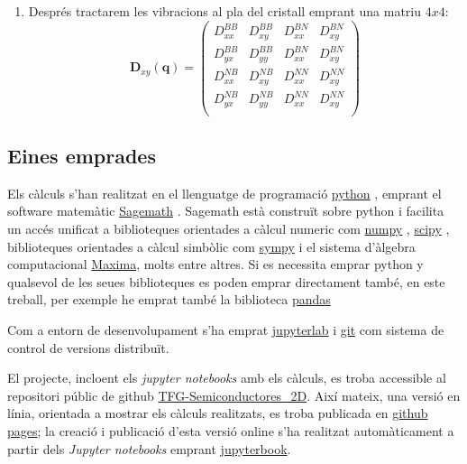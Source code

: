 \documentclass[12pt]{article} %
\let\vec\mathbf %
\begin{document}
{\begin{enumerate}
 \item Després tractarem les vibracions al pla del cristall emprant una matriu $4x4$:
 \begin{equation}
  \vec D_{xy}(\vec q)=
  \begin{pmatrix}
   D_{xx}^{BB} & D_{xy}^{BB} & D_{xx}^{BN} & D_{xy}^{BN}  \\
   D_{yx}^{BB} & D_{yy}^{BB} & D_{xx}^{BN} & D_{xy}^{BN}  \\
   D_{xx}^{NB} & D_{xy}^{NB} & D_{xx}^{NN} & D_{xy}^{NN} \\
   D_{yx}^{NB} & D_{yy}^{NB} & D_{xx}^{NN} & D_{xy}^{NN} \\
  \end{pmatrix}
\end{equation}

\end{enumerate}


 



\subsection{Eines emprades}

Els càlculs s'han realitzat en el llenguatge de programació \href{https://www.python.org/}{python} \cite{4160250}, emprant el software matemàtic \href{https://www.sagemath.org/}{Sagemath} \cite{sagemath}. Sagemath està construït sobre python i facilita un accés unificat a biblioteques orientades a càlcul numeric com \href{https://numpy.org/}{numpy} \cite{harris2020array} , \href{https://scipy.org/}{scipy} \cite{2020SciPy-NMeth}, biblioteques orientades a càlcul simbòlic com \href{https://www.sympy.org/}{sympy} i el sistema d'àlgebra computacional \href{https://maxima.sourceforge.io/}{Maxima}, molts entre altres. Si es necessita emprar python y qualsevol de les seues biblioteques es poden emprar directament també, en este treball, per exemple he emprat també la biblioteca \href{https://pandas.pydata.org/}{pandas}\cite{reback2020pandas} 

Com a entorn de desenvolupament s'ha emprat \href{https://jupyter.org/}{jupyterlab} i \href{https://git-scm.com/}{git} com sistema de control de versions distribuït. 

El projecte, incloent els \textit{\foreignlanguage{english}{jupyter notebooks}} amb els càlculs, es troba accessible al repositori públic de github \href{https://github.com/CasimirVictoria/TFG-Semiconductores\_2D}{TFG-Semiconductores\_2D}. Així mateix, una versió en línia, orientada a mostrar els càlculs realitzats, es troba publicada en \href{https://casimirvictoria.github.io/TFG-Semiconductores_2D/index.html}{github pages}; la creació i publicació d'esta versió online s'ha realitzat automàticament a partir dels \textit{Jupyter notebooks} emprant \href{https://jupyterbook.org/intro.html}{jupyterbook}.

}
\end{document}
